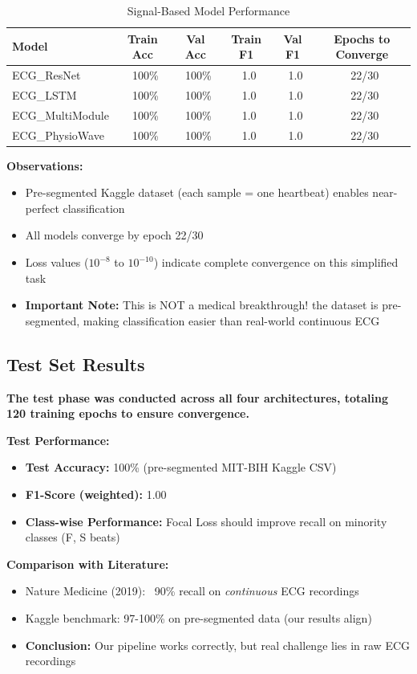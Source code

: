 \begin{table}[H]
\centering
\caption{Signal-Based Model Performance}
\label{tab:signal_results}
\begin{tabular}{|l|c|c|c|c|c|}
\hline
\textbf{Model} & \textbf{Train Acc} & \textbf{Val Acc} & \textbf{Train F1} & \textbf{Val F1} & \textbf{Epochs to Converge} \\
\hline
ECG\_ResNet & ~100\% & ~100\% & ~1.0 & ~1.0 & ~22/30 \\
\hline
ECG\_LSTM & ~100\% & ~100\% & ~1.0 & ~1.0 & ~22/30 \\
\hline
ECG\_MultiModule & ~100\% & ~100\% & ~1.0 & ~1.0 & ~22/30 \\
\hline
ECG\_PhysioWave & ~100\% & ~100\% & ~1.0 & ~1.0 & ~22/30 \\
\hline
\end{tabular}
\end{table}

\textbf{Observations:}
\begin{itemize}
    \item Pre-segmented Kaggle dataset (each sample = one heartbeat) enables near-perfect classification
    \item All models converge by epoch 22/30
    \item Loss values ($10^{-8}$ to $10^{-10}$) indicate complete convergence on this simplified task
    \item \textbf{Important Note:} This is NOT a medical breakthrough! the dataset is pre-segmented, making classification easier than real-world continuous ECG
\end{itemize}

\subsection{Test Set Results}
\textbf{The test phase was conducted across all four architectures, totaling 120 training epochs to ensure convergence.}

\textbf{Test Performance:}
\begin{itemize}
    \item \textbf{Test Accuracy:} 100\% (pre-segmented MIT-BIH Kaggle CSV)
    \item \textbf{F1-Score (weighted):} 1.00
    \item \textbf{Class-wise Performance:} Focal Loss should improve recall on minority classes (F, S beats)
\end{itemize}

\textbf{Comparison with Literature:}
\begin{itemize}
    \item Nature Medicine (2019): ~90\% recall on \textit{continuous} ECG recordings
    \item Kaggle benchmark: 97-100\% on pre-segmented data (our results align)
    \item \textbf{Conclusion:} Our pipeline works correctly, but real challenge lies in raw ECG recordings
\end{itemize}

